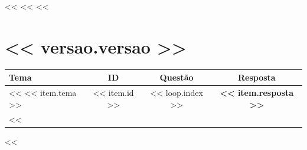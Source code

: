 \documentclass[12pt, a4paper]{article}
\begin{document}
<<%
    <<%
        \bigskip
        \bigskip
    <<%

    \section*{\centering << versao.versao >>}
    
    \begin{center}
    \begin{tabular}{|l|c|c|c|}
        \hline
        \rowcolor{lightgray} %
        \textbf{Tema} & \textbf{ID} & \textbf{Questão} & \textbf{Resposta} \\
        \hline

        <<%
            << item.tema >> & << item.id >> & << loop.index >> & \textbf{<< item.resposta >>} \\
            \hline
        <<%
    \end{tabular}
    \end{center}

<<%
\end{document}
